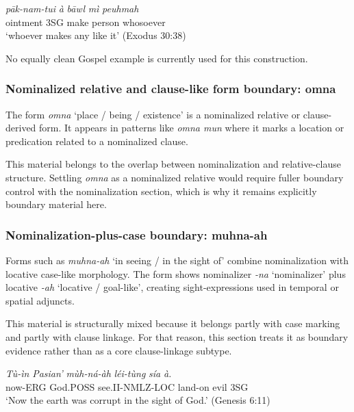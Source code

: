 \documentclass[
  11pt,
  a4paper,
]{article}
\newcommand{\tdim}[1]{\textit{#1}}
\newcommand{\tdimword}[1]{\textit{#1}}
\renewcommand{\textsc}[1]{{\footnotesize\MakeUppercase{#1}}}
\newcommand{\glossquote}[1]{`#1'}
\begin{document}
\begin{exe}
\ex \label{ex:clause-abawlmi-exodus30p38}
\gll \tdimword{pāk-nam-tui} \tdimword{à} \tdimword{bāwl} \tdimword{mì} \tdimword{peuhmah} \\
     ointment \textsc{3sg} make person whosoever \\
\glt \glossquote{whoever makes any like it} (Exodus 30:38)
\end{exe}

No equally clean Gospel example is currently used for this construction.

\subsubsection{Nominalized relative and clause-like form boundary:
omna}\label{nominalized-relative-and-clause-like-form-boundary-omna}

The form \tdim{omna} \glossquote{place / being / existence} is a
nominalized relative or clause-derived form. It appears in patterns like
\tdim{omna mun} where it marks a location or predication related to a
nominalized clause.

This material belongs to the overlap between nominalization and
relative-clause structure. Settling \tdim{omna} as a nominalized
relative would require fuller boundary control with the nominalization
section, which is why it remains explicitly boundary material here.

\subsubsection{Nominalization-plus-case boundary:
muhna-ah}\label{nominalization-plus-case-boundary-muhna-ah}

Forms such as \tdim{muhna-ah} \glossquote{in seeing / in the sight of}
combine nominalization with locative case-like morphology. The form
shows nominalizer \tdim{-na} \glossquote{nominalizer} plus locative
\tdim{-ah} \glossquote{locative / goal-like}, creating sight-expressions
used in temporal or spatial adjuncts.

This material is structurally mixed because it belongs partly with case
marking and partly with clause linkage. For that reason, this section
treats it as boundary evidence rather than as a core clause-linkage
subtype.

\begin{exe}
\ex \label{ex:clause-muhnaah-gen6p11}
\gll \tdimword{Tù-ìn} \tdimword{Pasian'} \tdimword{mùh-ná-àh} \tdimword{léi-tùng} \tdimword{sía} \tdimword{à.} \\
     now-\textsc{erg} God.\textsc{poss} see.\textsc{ii}-\textsc{nmlz}-\textsc{loc} land-on evil \textsc{3sg} \\
\glt \glossquote{Now the earth was corrupt in the sight of God.} (Genesis 6:11)
\end{exe}
\end{document}
